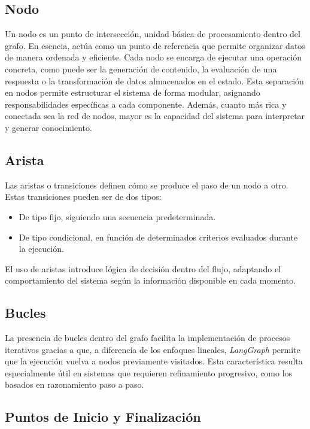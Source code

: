 \documentclass[12pt,a4paper,twoside,openright]{book}
\begin{document}
\subsection{Nodo}

Un nodo es un punto de intersección, unidad básica de procesamiento dentro del grafo. En esencia, actúa como un punto de referencia que permite organizar datos de
manera ordenada y eficiente. Cada nodo se encarga de ejecutar una operación concreta, como puede ser la generación de contenido, la evaluación de una respuesta o la
transformación de datos almacenados en el estado. Esta separación en nodos permite estructurar el sistema de forma modular, asignando responsabilidades específicas
a cada componente. Además, cuanto más rica y conectada sea la red de nodos, mayor es la capacidad del sistema para interpretar y generar conocimiento. \cite{nodes_msmk2025}

\subsection{Arista}

Las aristas o transiciones definen cómo se produce el paso de un nodo a otro. Estas transiciones pueden ser de dos tipos:
\begin{itemize}
  \item De tipo fijo, siguiendo una secuencia predeterminada.
  \item De tipo condicional, en función de determinados criterios evaluados durante la ejecución.
\end{itemize}
El uso de aristas introduce lógica de decisión dentro del flujo, adaptando el comportamiento del sistema según la información disponible en cada momento. \cite{aperezl_langgraph2024}

\subsection{Bucles}

La presencia de bucles dentro del grafo facilita la implementación de procesos iterativos gracias a que, a diferencia de los enfoques lineales,
\emph{LangGraph} permite que la ejecución vuelva a nodos previamente visitados. Esta característica resulta especialmente útil en sistemas que requieren
refinamiento progresivo, como los basados en razonamiento paso a paso.

\subsection{Puntos de Inicio y Finalización}
\end{document}
